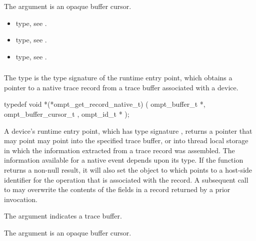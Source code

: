 The  argument is an opaque buffer cursor.

\crossreferences
\begin{itemize}
\item {} type, see .

\item {} type, see .

\item {} type, see .
\end{itemize}



\subsubsection{}
\label{sec:ompt_get_record_native_t}

\summary
The  type is the type signature of the 
 runtime entry point, which obtains a pointer 
to a native trace record from a trace buffer associated with a device.

\format
\begin{ccppspecific}
\begin{omptInquiry}
typedef void *(*ompt_get_record_native_t) (
  ompt_buffer_t *,
  ompt_buffer_cursor_t ,
  ompt_id_t *
);
\end{omptInquiry}
\end{ccppspecific}

\descr
A device's  runtime entry point, which has
type signature , returns a pointer that may 
point may point into the specified trace buffer, or into thread local 
storage in which the information extracted from a trace record was 
assembled. The information available for a native event depends upon 
its type. If the function returns a non-null result, it will also set the
object to which  points to a host-side identifier for the 
operation that is associated with the record. A subsequent call to 
 may overwrite the contents of the fields 
in a record returned by a prior invocation.

\argdesc
The  argument indicates a trace buffer.

The  argument is an opaque buffer cursor.

